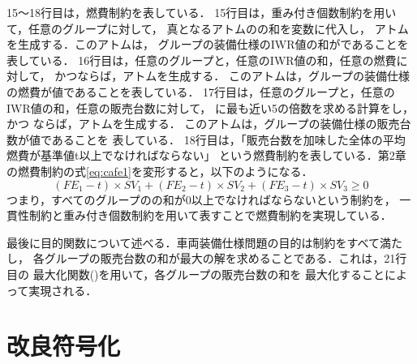 15〜18行目は，燃費制約を表している．
15行目は，重み付き個数制約を用いて，任意のグループに対して，
真となるアトムのの和を変数に代入し，
アトムを生成する．このアトムは，
グループの装備仕様のIWR値の和がであることを表している．
%
16行目は，任意のグループと，任意のIWR値の和，任意の燃費に対して，
かつならば，アトムを生成する．
このアトムは，グループの装備仕様の燃費が値であることを表している．
%
17行目は，任意のグループと，任意のIWR値の和，任意の販売台数に対して，
に最も近い5の倍数を求める計算をし，かつ
ならば，アトムを生成する．
このアトムは，グループの装備仕様の販売台数が値であることを
表している．
18行目は，「販売台数を加味した全体の平均燃費が基準値t以上でなければならない」
という燃費制約を表している．第2章の燃費制約の式\ref{eq:cafe1}を変形すると，以下のようになる．
\begin{equation}
\label{eq:cafe2}
(FE_{1} - t) \times SV_{1} + (FE_{2} - t) \times SV_{2} + (FE_{3} - t) \times SV_{3} \geq 0
\end{equation}
つまり，すべてのグループのの和が0以上でなければならないという制約を，
一貫性制約と重み付き個数制約を用いて表すことで燃費制約を実現している．

最後に目的関数について述べる．車両装備仕様問題の目的は制約をすべて満たし，
各グループの販売台数の和が最大の解を求めることである．これは，21行目の
最大化関数()を用いて，各グループの販売台数の和を
最大化することによって実現される．

\section{改良符号化}


